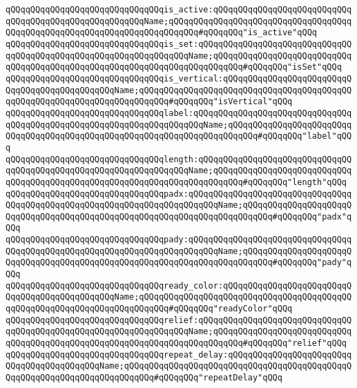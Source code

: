 \verb|qQQqqQQqqQQqqQQqqQQqqQQqqQQqqQQqis_active:qQQqqQQqqQQqqQQqqQQqqQQqqQQqqQQqqQQqqQQqqQQqqQQqqQQqqQQqName;qQQqqQQqqQQqqQQqqQQqqQQqqQQqqQQqqQQqqQQqqQQqqQQqqQQqqQQqqQQqqQQqqQQqqQQqqQQq#qQQqqQQq"is_active"qQQq|\newline
\verb|qQQqqQQqqQQqqQQqqQQqqQQqqQQqqQQqis_set:qQQqqQQqqQQqqQQqqQQqqQQqqQQqqQQqqQQqqQQqqQQqqQQqqQQqqQQqqQQqqQQqqQQqName;qQQqqQQqqQQqqQQqqQQqqQQqqQQqqQQqqQQqqQQqqQQqqQQqqQQqqQQqqQQqqQQqqQQqqQQqqQQq#qQQqqQQq"isSet"qQQq|\newline
\verb|qQQqqQQqqQQqqQQqqQQqqQQqqQQqqQQqis_vertical:qQQqqQQqqQQqqQQqqQQqqQQqqQQqqQQqqQQqqQQqqQQqqQQqName;qQQqqQQqqQQqqQQqqQQqqQQqqQQqqQQqqQQqqQQqqQQqqQQqqQQqqQQqqQQqqQQqqQQqqQQqqQQq#qQQqqQQq"isVertical"qQQq|\newline
\newline
\verb|qQQqqQQqqQQqqQQqqQQqqQQqqQQqqQQqlabel:qQQqqQQqqQQqqQQqqQQqqQQqqQQqqQQqqQQqqQQqqQQqqQQqqQQqqQQqqQQqqQQqqQQqqQQqName;qQQqqQQqqQQqqQQqqQQqqQQqqQQqqQQqqQQqqQQqqQQqqQQqqQQqqQQqqQQqqQQqqQQqqQQqqQQq#qQQqqQQq"label"qQQq|\newline
\verb|qQQqqQQqqQQqqQQqqQQqqQQqqQQqqQQqlength:qQQqqQQqqQQqqQQqqQQqqQQqqQQqqQQqqQQqqQQqqQQqqQQqqQQqqQQqqQQqqQQqqQQqName;qQQqqQQqqQQqqQQqqQQqqQQqqQQqqQQqqQQqqQQqqQQqqQQqqQQqqQQqqQQqqQQqqQQqqQQqqQQq#qQQqqQQq"length"qQQq|\newline
\newline
\verb|qQQqqQQqqQQqqQQqqQQqqQQqqQQqqQQqpadx:qQQqqQQqqQQqqQQqqQQqqQQqqQQqqQQqqQQqqQQqqQQqqQQqqQQqqQQqqQQqqQQqqQQqqQQqqQQqName;qQQqqQQqqQQqqQQqqQQqqQQqqQQqqQQqqQQqqQQqqQQqqQQqqQQqqQQqqQQqqQQqqQQqqQQqqQQq#qQQqqQQq"padx"qQQq|\newline
\verb|qQQqqQQqqQQqqQQqqQQqqQQqqQQqqQQqpady:qQQqqQQqqQQqqQQqqQQqqQQqqQQqqQQqqQQqqQQqqQQqqQQqqQQqqQQqqQQqqQQqqQQqqQQqqQQqName;qQQqqQQqqQQqqQQqqQQqqQQqqQQqqQQqqQQqqQQqqQQqqQQqqQQqqQQqqQQqqQQqqQQqqQQqqQQq#qQQqqQQq"pady"qQQq|\newline
\newline
\verb|qQQqqQQqqQQqqQQqqQQqqQQqqQQqqQQqready_color:qQQqqQQqqQQqqQQqqQQqqQQqqQQqqQQqqQQqqQQqqQQqqQQqName;qQQqqQQqqQQqqQQqqQQqqQQqqQQqqQQqqQQqqQQqqQQqqQQqqQQqqQQqqQQqqQQqqQQqqQQqqQQq#qQQqqQQq"readyColor"qQQq|\newline
\verb|qQQqqQQqqQQqqQQqqQQqqQQqqQQqqQQqrelief:qQQqqQQqqQQqqQQqqQQqqQQqqQQqqQQqqQQqqQQqqQQqqQQqqQQqqQQqqQQqqQQqqQQqName;qQQqqQQqqQQqqQQqqQQqqQQqqQQqqQQqqQQqqQQqqQQqqQQqqQQqqQQqqQQqqQQqqQQqqQQqqQQq#qQQqqQQq"relief"qQQq|\newline
\verb|qQQqqQQqqQQqqQQqqQQqqQQqqQQqqQQqrepeat_delay:qQQqqQQqqQQqqQQqqQQqqQQqqQQqqQQqqQQqqQQqqQQqName;qQQqqQQqqQQqqQQqqQQqqQQqqQQqqQQqqQQqqQQqqQQqqQQqqQQqqQQqqQQqqQQqqQQqqQQqqQQq#qQQqqQQq"repeatDelay"qQQq|\newline
